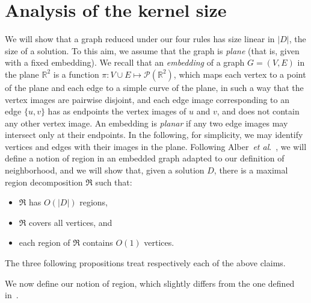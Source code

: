\documentclass[a4paper,11pt]{article}
\begin{document}
\section{Analysis of the kernel size} \label{sec:analysis}

We will show that a graph reduced under our four rules has size linear in $|D|$, the size of a solution. To this aim, we assume that the graph is \emph{plane} (that is, given with a fixed embedding).
We recall that an \emph{embedding} of a graph $G=(V,E)$ in the plane $\mathbb{R}^2 $ is a function $\pi : V \cup E \mapsto \mathcal{P}(\mathbb{R}^2) $, which maps each vertex to a point of the plane and each edge to a simple curve of the plane, in such a way that the vertex images are pairwise disjoint, and each edge image corresponding to an edge $\{u,v\}$ has as endpoints the vertex images of $u$ and $v$, and does not contain any other vertex image. An embedding is \emph{planar} if any two edge images may intersect only at their endpoints. In the following, for simplicity, we may identify vertices and edges with their images in the plane. Following Alber~\emph{et al}.~\cite{AFN04}, we will define a notion of region in an embedded graph adapted to our definition of neighborhood, and we will show that, given a solution $D$, there is a maximal region decomposition $\Re$ such that:
\begin{itemize}\itemsep0em
  \item $\Re$ has $O(|D|)$ regions,
  \item $\Re$ covers all vertices, and
  \item each region of $\Re$ contains $O(1)$ vertices.
\end{itemize}
The three following propositions treat respectively each of the above claims.



We now define our notion of region, which slightly differs from the one defined in~\cite{AFN04}.
\end{document}
